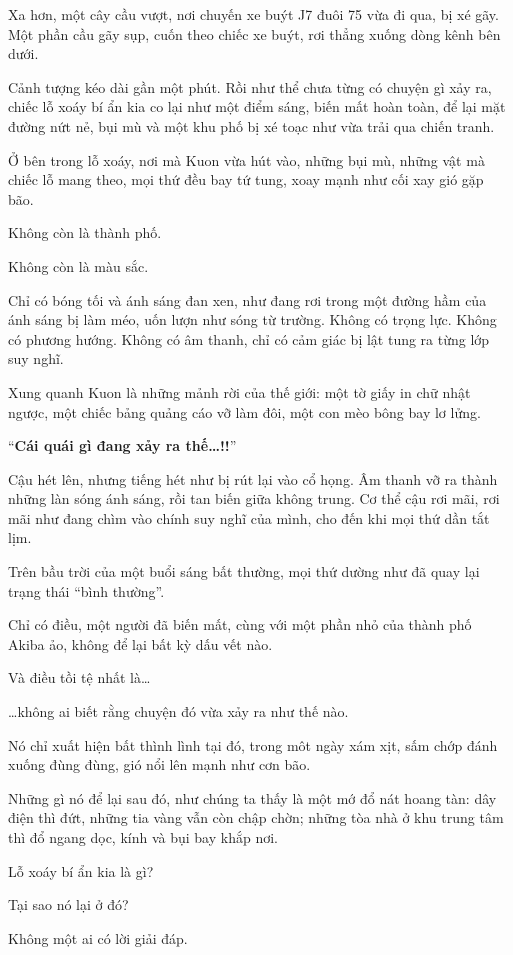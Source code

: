 \documentclass[../main.tex]{subfiles}
\begin{document}
Xa hơn, một cây cầu vượt, nơi chuyến xe buýt J7 đuôi 75 vừa đi qua, bị xé gãy. Một phần cầu gãy sụp, cuốn theo chiếc xe buýt, rơi thẳng xuống dòng kênh bên dưới.

Cảnh tượng kéo dài gần một phút. Rồi như thể chưa từng có chuyện gì xảy ra, chiếc lỗ xoáy bí ẩn kia co lại như một điểm sáng, biến mất hoàn toàn, để lại mặt đường nứt nẻ, bụi mù và một khu phố bị xé toạc như vừa trải qua chiến tranh.

Ở bên trong lỗ xoáy, nơi mà Kuon vừa hút vào, những bụi mù, những vật mà chiếc lỗ mang theo, mọi thứ đều bay tứ tung, xoay mạnh như cối xay gió gặp bão.

Không còn là thành phố.

Không còn là màu sắc.

Chỉ có bóng tối và ánh sáng đan xen, như đang rơi trong một đường hầm của ánh sáng bị làm méo, uốn lượn như sóng từ trường. Không có trọng lực. Không có phương hướng. Không có âm thanh, chỉ có cảm giác bị lật tung ra từng lớp suy nghĩ.

Xung quanh Kuon là những mảnh rời của thế giới: một tờ giấy in chữ nhật ngược, một chiếc bảng quảng cáo vỡ làm đôi, một con mèo bông bay lơ lửng.

``\textbf{Cái quái gì đang xảy ra thế\dots!!}''

Cậu hét lên, nhưng tiếng hét như bị rút lại vào cổ họng. Âm thanh vỡ ra thành những làn sóng ánh sáng, rồi tan biến giữa không trung. Cơ thể cậu rơi mãi, rơi mãi như đang chìm vào chính suy nghĩ của mình, cho đến khi mọi thứ dần tắt lịm.

\il

Trên bầu trời của một buổi sáng bất thường, mọi thứ dường như đã quay lại trạng thái ``bình thường''.

Chỉ có điều, một người đã biến mất, cùng với một phần nhỏ của thành phố Akiba ảo, không để lại bất kỳ dấu vết nào.

Và điều tồi tệ nhất là\dots

\dots không ai biết rằng chuyện đó vừa xảy ra như thế nào.

Nó chỉ xuất hiện bất thình lình tại đó, trong môt ngày xám xịt, sấm chớp đánh xuống đùng đùng, gió nổi lên mạnh như cơn bão.

Những gì nó để lại sau đó, như chúng ta thấy là một mớ đổ nát hoang tàn: dây điện thì đứt, những tia vàng vẫn còn chập chờn; những tòa nhà ở khu trung tâm thì đổ ngang dọc, kính và bụi bay khắp nơi.

Lỗ xoáy bí ẩn kia là gì?

Tại sao nó lại ở đó?

Không một ai có lời giải đáp.
\end{document}
